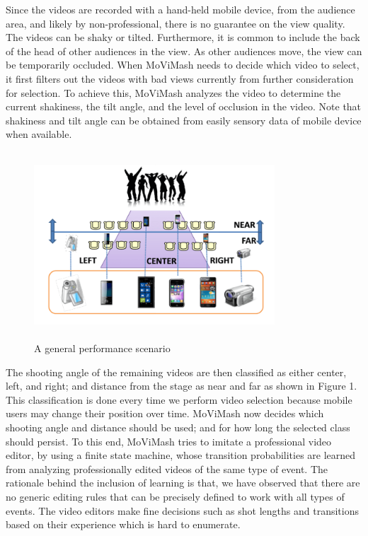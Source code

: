 \documentclass{clsfile}
\begin{document}
Since the videos are recorded with a hand-held mobile device, from the audience area, and likely by non-professional, there is no guarantee on the view quality. The videos can be shaky or tilted. Furthermore, it is common to include the back of the head of other audiences in the view. As other audiences move, the view can be temporarily occluded. When MoViMash needs to decide which video to select, it first filters out the videos with bad views currently from further consideration for selection. To achieve this, MoViMash analyzes the video to determine the current shakiness, the tilt angle, and the level of occlusion in the video. Note that shakiness and tilt angle can be obtained from easily sensory data of mobile device when available.
\begin{figure}
\includegraphics[width=9cm, height=7cm]{fig1.png}
   \caption{ A general performance scenario}
\end{figure}


The shooting angle of the remaining videos are then classified as either center, left, and right; and distance from the stage as near and far as shown in Figure 1. This classification is done every time we perform video selection because mobile users may change their position over time. MoViMash now decides which shooting angle and distance should be used; and for how long the selected class should persist. To this end, MoViMash tries to imitate a professional video editor, by using a finite state machine, whose transition probabilities are learned from analyzing professionally edited videos of the same type of event. The rationale behind the inclusion of learning is that, we have observed that there are no generic editing rules that can be precisely defined to work with all types of events. The video editors make fine decisions such as shot lengths and transitions based on their experience which is hard to enumerate.
\end{document}
